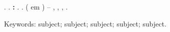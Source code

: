 \newpage
\begin{Spacing}{1}
\begin{resumo}
\begin{emph}


\noindent
{\imprimirautorcitacao}. 
   \ifx\imprimirtitulo\empty   
      \textbf{\imprimirtitleabstract}.
   \else
      \textbf{{\imprimirtitleabstract}: }{\imprimirsubtitle}.
   \fi
{\imprimirdata}. {\imprimirprojetoEn} ({\imprimirtituloAcademicoEn} em {\imprimirprogramaEn}) -- {\imprimirInstituicaoCurtoEn}, {\imprimirInstituicaoCampusEn}, {\imprimirlocal}, {\imprimirdata}.

\vspace{1cm}



\lipsum[10] \lipsum[11] \lipsum[12] \lipsum[13]

\vspace{1cm}
Keywords: subject; subject; subject; subject; subject. 

\end{emph}
\end{resumo}
\end{Spacing}
